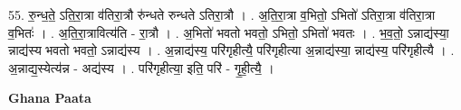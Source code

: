\documentclass[17pt]{extarticle}
\begin{document}
55. रु॒न्ध॒ते॒ ऽति॒रा॒त्रा व॑तिरा॒त्रौ रु॑न्धते रुन्धते ऽतिरा॒त्रौ । . अ॒ति॒रा॒त्रा व॒भितो॒ ऽभितो॑ ऽतिरा॒त्रा व॑तिरा॒त्रा व॒भितः॑ । . अ॒ति॒रा॒त्रावित्य॑ति - रा॒त्रौ । . अ॒भितो॑ भवतो भवतो॒ ऽभितो॒ ऽभितो॑ भवतः । . भ॒व॒तो॒ ऽन्नाद्य॑स्या॒ न्नाद्य॑स्य भवतो भवतो॒ ऽन्नाद्य॑स्य । . अ॒न्नाद्य॑स्य॒ परि॑गृहीत्यै॒ परि॑गृहीत्या अ॒न्नाद्य॑स्या॒ न्नाद्य॑स्य॒ परि॑गृहीत्यै । . अ॒न्नाद्य॒स्येत्य॑न्न - अद्य॑स्य । . परि॑गृहीत्या॒ इति॒ परि॑ - गृ॒ही॒त्यै॒ । \newline

\textbf{Ghana Paata } \newline
\end{document}

